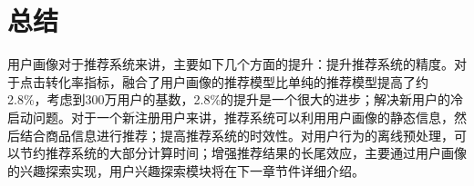       \section{总结}
      用户画像对于推荐系统来讲，主要如下几个方面的提升：提升推荐系统的精度。对于点击转化率指标，融合了用户画像的推荐模型比单纯的推荐模型提高了约2.8\%，考虑到300万用户的基数，2.8\%的提升是一个很大的进步；解决新用户的冷启动问题。对于一个新注册用户来讲，推荐系统可以利用用户画像的静态信息，然后结合商品信息进行推荐；提高推荐系统的时效性。对用户行为的离线预处理，可以节约推荐系统的大部分计算时间；增强推荐结果的长尾效应，主要通过用户画像的兴趣探索实现，用户兴趣探索模块将在下一章节件详细介绍。
